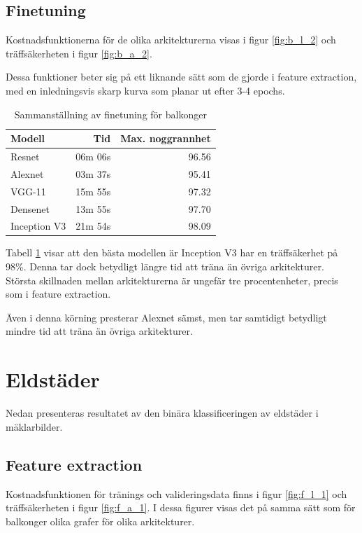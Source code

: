 \documentclass[]{kththesis}
\begin{document}
\subsection{Finetuning}
Kostnadsfunktionerna för de olika arkitekturerna visas i figur \ref{fig:b_l_2} och träffsäkerheten i figur \ref{fig:b_a_2}. 

Dessa funktioner beter sig på ett liknande sätt som de gjorde i feature extraction, med en inledningsvis skarp kurva som planar ut efter 3-4 epochs.



\begin{table}[!htbp]
  \centering
  \begin{tabular}{|l|r|r|}
    Modell & Tid & Max. noggrannhet \\ 
    \hline
    Resnet       & 06m 06s & 96.56 \\
    Alexnet      & 03m 37s & 95.41 \\
    VGG-11       & 15m 55s & 97.32 \\
    Densenet     & 13m 55s & 97.70 \\
    Inception V3 & 21m 54s & 98.09 \\
  \end{tabular}
  
  \caption{Sammanställning av finetuning för balkonger}
  \label{fig:sam_2}
  
\end{table}


Tabell \ref{fig:sam_2} visar att den bästa modellen är Inception V3 har en träffsäkerhet på 98\%. 
Denna tar dock betydligt längre tid att träna än övriga arkitekturer. 
Största skillnaden mellan arkitekturerna är ungefär tre procentenheter, precis som i feature extraction.

Även i denna körning presterar Alexnet sämst, men tar samtidigt betydligt mindre tid att träna än övriga arkitekturer.


\section{Eldstäder}
Nedan presenteras resultatet av den binära klassificeringen av eldstäder i mäklarbilder.


\subsection{Feature extraction}
Kostnadsfunktionen för tränings och valideringsdata finns i figur \ref{fig:f_l_1} och träffsäkerheten i figur \ref{fig:f_a_1}.
I dessa figurer visas det på samma sätt som för balkonger olika grafer för olika arkitekturer.
\end{document}
